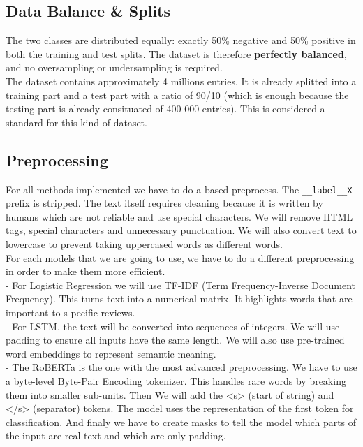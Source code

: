 \documentclass{article}
\begin{document}
\subsection{Data Balance \& Splits}
The two classes are distributed equally: exactly 50\% negative and 50\% positive
in both the training and test splits.
The dataset is therefore \textbf{perfectly balanced}, and no oversampling or
undersampling is required.\\
The dataset contains approximately 4 millions entries. It is already splitted into 
a training part and a test part with a ratio of 90/10 (which is enough because the 
testing part is already consituated of 400 000 entries). This is considered a 
standard for this kind of dataset.

\subsection{Preprocessing}
For all methods implemented we have to do a based preprocess. The \texttt{\_\_label\_\_X}
prefix is stripped.
The text itself requires cleaning because it is written by humans which are not reliable 
and use special characters. We will remove HTML tags, special characters and unnecessary 
punctuation. We will also convert text to lowercase to prevent taking uppercased words 
as different words.\\
For each models that we are going to use, we have to do a different preprocessing in 
order to make them more efficient.\\

- For Logistic Regression we will use TF-IDF (Term Frequency-Inverse Document Frequency). 
This turns text into a numerical matrix. It highlights words that are important to s
pecific reviews.\\
- For LSTM, the text will be converted into sequences of integers. We will use padding 
to ensure all inputs have the same length. We will also use pre-trained word 
embeddings to represent semantic meaning.\\
- The RoBERTa is the one with the most advanced preprocessing. We have to use a 
byte-level Byte-Pair Encoding tokenizer. This handles rare words by breaking them into 
smaller sub-units. Then We will add the <s> (start of string) and </s> (separator) 
tokens. The model uses the representation of the first token for classification. And 
finaly we have to create masks to tell the model which parts of the input are real text 
and which are only padding.
\end{document}
